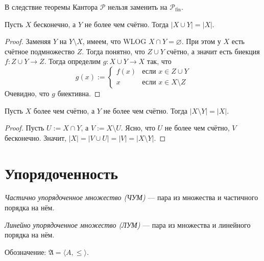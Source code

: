 \documentclass[12pt,a4paper]{article}
\newcommand{\subsets}{\ensuremath{\mathcal{P}}\xspace}
\newcommand{\finsubsets}{\ensuremath{\mathcal{P_{\mathrm{fin}}}}\xspace}
\newcommand{\ZFC}{\ensuremath{\mathrm{ZFC}}\xspace}
\begin{document}
    \begin{corollary}
        В следствие теоремы Кантора $\subsets$ нельзя заменить на $\finsubsets$.
    \end{corollary}

    \begin{theorem}[в \ZFC]
        Пусть $X$ бесконечно, а $Y$ не более чем счётно. Тогда $|X \cup Y| = |X|$.
    \end{theorem}

    \begin{proof}
        Заменяя $Y$ на $Y\setminus X$, имеем, что WLOG $X \cap Y = \varnothing$. При этом у $X$ есть счётное подмножество $Z$. Тогда понятно, что $Z \cup Y$ счётно, а значит есть биекция $f: Z \cup Y \to Z$. Тогда определим $g: X \cup Y \to X$ так, что
        \[g(x) := \begin{cases}
            f(x)& \text{если $x \in Z \cup Y$}\\
            x& \text{если $x \in X \setminus Z$}
        \end{cases}\]
        Очевидно, что $g$ биективна.
    \end{proof}

    \begin{corollary}
        Пусть $X$ более чем счётно, а $Y$ не более чем счётно. Тогда $|X \setminus Y| = |X|$.
    \end{corollary}

    \begin{proof}
        Пусть $U := X \cap Y$, а $V := X \setminus U$. Ясно, что $U$ не более чем счётно, $V$ бесконечно. Значит, $|X| = |V \cup U| = |V| = |X \setminus Y|$. 
    \end{proof}

    \section{Упорядоченность}

    \begin{definition}
        \emph{Частично упорядоченное множество (ЧУМ)} --- пара из множества и частичного порядка на нём.

        \emph{Линейно упорядоченное множество (ЛУМ)} --- пара из множества и линейного порядка на нём.

        Обозначение: $\mathfrak{A} = \langle A, \leqslant \rangle$.
    \end{definition}
\end{document}
